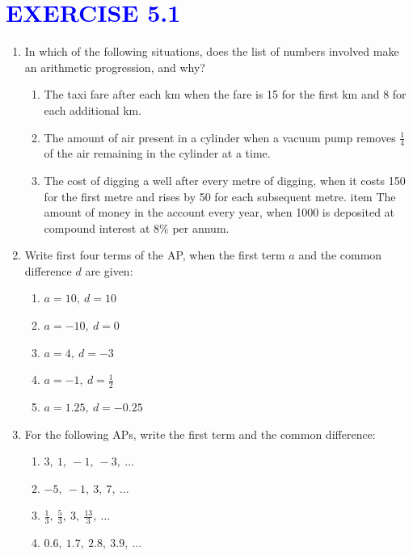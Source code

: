 \documentclass[12pt]{article}
\begin{document}
\section*{\textcolor{blue}{\large EXERCISE 5.1}}
\begin{enumerate}
\item In which of the following situations, does the list of numbers involved make an arithmetic progression, and why?

\begin{enumerate}[label=(\alph*)]
    \item The taxi fare after each km when the fare is 15 for the first km and 8 for each additional km.
    \item The amount of air present in a cylinder when a vacuum pump removes $\frac{1}{4}$ of the air remaining in the cylinder at a time.
    \item The cost of digging a well after every metre of digging, when it costs 150 for the first metre and rises by 50 for each subsequent metre.
    item The amount of money in the account every year, when 1000 is deposited at compound interest at $8\%$ per annum.
\end{enumerate}

\item Write first four terms of the AP, when the first term \( a \) and the common difference \( d \) are given:

\begin{multicols}{2}
\begin{enumerate}[label=(\alph*)]
    \item \( a = 10,\ d = 10 \)
    \item \( a = -10,\ d = 0 \)
    \item \( a = 4,\ d = -3 \)
    \item \( a = -1,\ d = \frac{1}{2} \)
    \item \( a = 1.25,\ d = -0.25 \)
\end{enumerate}
\end{multicols}

\item For the following APs, write the first term and the common difference:

\begin{multicols}{2}
\begin{enumerate}[label=(\alph*)]
    \item \( 3,\ 1,\ -1,\ -3,\ \ldots \)
    \item \( -5,\ -1,\ 3,\ 7,\ \ldots \)
    \item \( \frac{1}{3},\ \frac{5}{3},\ 3,\ \frac{13}{3},\ \ldots \)
    \item \( 0.6,\ 1.7,\ 2.8,\ 3.9,\ \ldots \)
\end{enumerate}
\end{multicols}


\end{enumerate}
\end{document}
